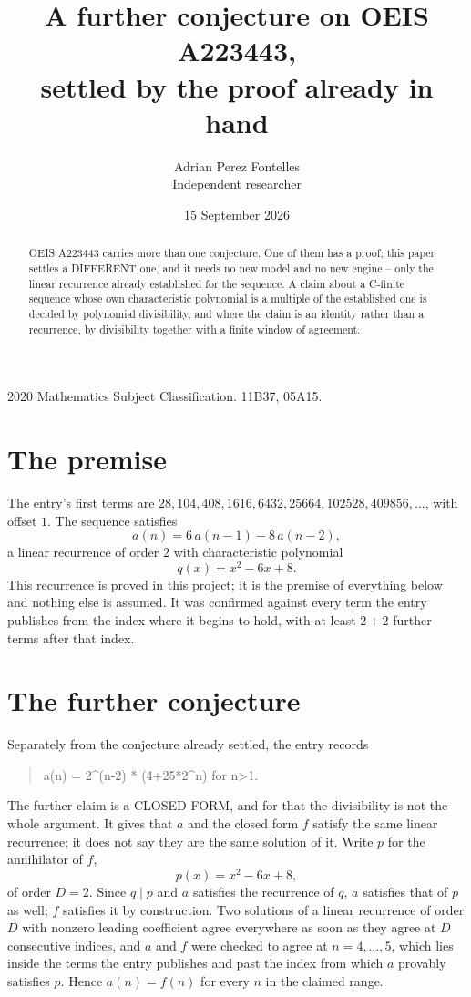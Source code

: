 \documentclass[11pt,a4paper]{article}
\title{A further conjecture on OEIS A223443,\\ \large settled by the proof already in hand}
\author{Adrian Perez Fontelles\\ \small Independent researcher}
\date{15 September 2026}
\theoremstyle{plain}
\theoremstyle{definition}
\begin{document}
\maketitle

\begin{abstract}
OEIS A223443 carries more than one conjecture. One of them has a proof; this paper settles a
DIFFERENT one, and it needs no new model and no new engine -- only the linear recurrence already
established for the sequence. A claim about a C-finite sequence whose own characteristic
polynomial is a multiple of the established one is decided by polynomial divisibility, and where
the claim is an identity rather than a recurrence, by divisibility together with a finite window
of agreement.
\end{abstract}

\noindent\small 2020 Mathematics Subject Classification. 11B37, 05A15.\normalsize

\section{The premise}

The entry's first terms are $28, 104, 408, 1616, 6432, 25664, 102528, 409856,\dots$, with offset $1$. The sequence satisfies
\[
  a(n)=6\,a(n-1) - 8\,a(n-2) ,
\]
a linear recurrence of order $2$ with characteristic polynomial
\[
  q(x)=x^{2} - 6 x + 8 .
\]
This recurrence is proved in this project; it is the premise of everything below and nothing else is assumed.
It was confirmed against every term the entry publishes from the index where it begins to hold,
with at least $2+2$ further terms after that index.

\section{The further conjecture}

Separately from the conjecture already settled, the entry records

\begin{quote}\raggedright a(n) = 2\^{}(n-2) * (4+25*2\^{}n) for n>1.\end{quote}

The further claim is a CLOSED FORM, and for that the divisibility is not the whole argument. It
gives that $a$ and the closed form $f$ satisfy the same linear recurrence; it does not say they
are the same solution of it. Write $p$ for the annihilator of $f$,
\[
  p(x)=x^{2} - 6 x + 8 ,
\]
of order $D=2$. Since $q\mid p$ and $a$ satisfies the recurrence of $q$, $a$ satisfies that of
$p$ as well; $f$ satisfies it by construction. Two solutions of a linear recurrence of order $D$
with nonzero leading coefficient agree everywhere as soon as they agree at $D$ consecutive
indices, and $a$ and $f$ were checked to agree at $n=4,\dots,5$,
which lies inside the terms the entry publishes and past the index from which $a$ provably
satisfies $p$. Hence $a(n)=f(n)$ for every $n$ in the claimed range.
\end{document}
